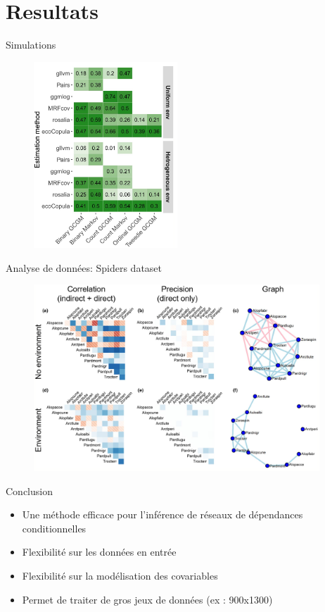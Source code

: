 \documentclass[11pt]{beamer}
\begin{document}
\section{Resultats}
\begin{frame}{Simulations}
\begin{figure}
\includegraphics[height=7cm]{images/simu.png}
\end{figure}
\end{frame}
\begin{frame}{Analyse de données: Spiders dataset}
\begin{figure}
\includegraphics[height=7cm]{images/ex1.png}
\end{figure}
\end{frame}
\begin{frame}{Conclusion}
\begin{itemize}
\item Une méthode efficace pour l'inférence de réseaux de dépendances conditionnelles
\item Flexibilité sur les données en entrée
\item Flexibilité sur la modélisation des covariables
\item Permet de traiter de gros jeux de données (ex : 900x1300)
\end{itemize}

\end{frame}
\end{document}
